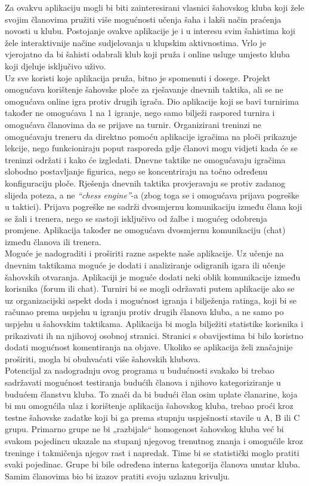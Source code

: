 	     	\noindent   Za ovakvu aplikaciju mogli bi biti zainteresirani vlasnici šahovskog
			kluba koji žele svojim članovima pružiti više mogućnosti učenja šaha i
			lakši način praćenja novosti u klubu. Postojanje ovakve aplikacije je i
			u interesu svim šahistima koji žele interaktivnije načine sudjelovanja u
			klupskim aktivnostima. Vrlo je vjerojatno da bi šahisti odabrali klub
			koji pruža i online usluge umjesto kluba koji djeluje isključivo uživo. \\
		    Uz sve koristi koje aplikacija pruža, bitno je spomenuti i dosege.
			Projekt omogućava korištenje šahovske ploče za rješavanje dnevnih
			taktika, ali se ne omogućava online igra protiv drugih igrača. Dio
			aplikacije koji se bavi turnirima također ne omogućava 1 na 1 igranje,
			nego samo bilježi raspored turnira i omogućava članovima da se prijave
			na turnir. Organizirani treninzi ne omogućavaju treneru da direktno
			pomoću aplikacije igračima na ploči prikazuje lekcije, nego
			funkcioniraju poput rasporeda gdje članovi mogu vidjeti kada će se
			treninzi održati i kako će izgledati. Dnevne taktike ne omogućavaju
			igračima slobodno postavljanje figurica, nego se koncentriraju na točno
			određenu konfiguraciju ploče. Rješenja dnevnih taktika provjeravaju se
			protiv zadanog slijeda poteza, a ne \textit{``chess engine''}-a (zbog toga se i
			omogućava prijava pogreške u taktici). Prijava pogreške ne sadrži
			dvosmjernu komunikaciju između člana koji se žali i trenera, nego se
			sastoji isključivo od žalbe i mogućeg odobrenja promjene. Aplikacija
			također ne omogućava dvosmjernu komunikaciju (chat) između članova ili
			trenera.\\
			Moguće je nadograditi i proširiti razne aspekte naše aplikacije. Uz
			učenje na dnevnim taktikama moguće je dodati i analiziranje odigranih
			igara ili učenje šahovskih otvaranja. Aplikaciji je moguće dodati neki
			oblik komunikacije između korisnika (forum ili chat). Turniri bi se
			mogli održavati putem aplikacije ako se uz organizacijski aspekt doda i
			mogućnost igranja i bilježenja ratinga, koji bi se računao prema
			uspjehu u igranju protiv drugih članova kluba, a ne samo po uspjehu u
			šahovskim taktikama. Aplikacija bi mogla bilježiti statistike korisnika i
			prikazivati ih na njihovoj osobnoj stranici. Stranici s obavijestima bi
			bilo koristno dodati mogućnost komentiranja na objave. Ukoliko se
			aplikacija želi značajnije proširiti, mogla bi obuhvaćati više šahovskih
			klubova.\\
		    Potencijal za nadogradnju ovog programa u budućnosti svakako bi trebao sadržavati mogućnost testiranja budućih članova i njihovo kategoriziranje u budućem članstvu kluba. To znači da bi budući član osim uplate članarine, koja bi mu omogućila ulaz i korištenje aplikacija šahovskog kluba, trebao proći kroz testne šahovske zadatke koji bi ga prema stupnju uspješnosti stavile u A, B ili C grupu. Primarno grupe ne bi „razbijale“ homogenost šahovskog kluba već bi svakom pojedincu ukazale na stupanj njegovog trenutnog znanja i omogućile kroz treninge i takmičenja njegov rast i napredak. Time bi se statistički moglo pratiti svaki pojedinac. Grupe bi bile određena interna kategorija članova unutar kluba. Samim članovima bio bi izazov pratiti svoju uzlaznu krivulju. \\
